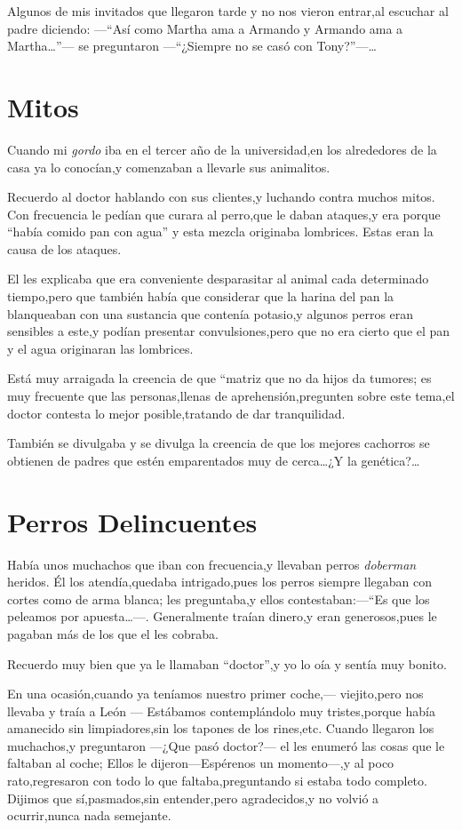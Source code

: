 \documentclass[letterpaper,12pt]{book}
\begin{document}
Algunos de mis invitados que llegaron tarde y no nos vieron entrar,al escuchar al padre diciendo: ---``Así como Martha ama a Armando y Armando ama a Martha\ldots''--- se preguntaron ---``¿Siempre no se casó con Tony?''---\ldots

\chapter{Mitos}
Cuando mi \textit{gordo} iba en el tercer año de la universidad,en los alrededores de la casa ya lo conocían,y comenzaban a llevarle sus animalitos.

Recuerdo al doctor hablando con sus clientes,y luchando contra muchos mitos. Con frecuencia le pedían que curara al perro,que le daban ataques,y era porque ``había comido pan con agua'' y esta mezcla originaba lombrices. Estas eran la causa de los ataques.

El les explicaba que era conveniente desparasitar al animal cada determinado tiempo,pero que también había que considerar que la harina del pan la blanqueaban con una sustancia que contenía potasio,y algunos perros eran sensibles a este,y podían presentar convulsiones,pero que no era cierto que el pan y el agua originaran las lombrices.

Está muy arraigada la creencia de que ``matriz que no da hijos da tumores; es muy frecuente que las personas,llenas de aprehensión,pregunten sobre este tema,el doctor contesta lo mejor posible,tratando de dar tranquilidad. 

También se divulgaba y se divulga la creencia de que los mejores cachorros se obtienen de padres que estén emparentados muy de cerca\ldots¿Y la genética?\ldots

\chapter{Perros Delincuentes}
Había unos muchachos que iban con frecuencia,y llevaban perros \textit{doberman} heridos. Él los atendía,quedaba intrigado,pues los perros siempre llegaban con cortes como de arma blanca; les preguntaba,y ellos contestaban:---``Es que los peleamos por apuesta\ldots---. Generalmente traían dinero,y eran generosos,pues le pagaban más de los que el les cobraba.

Recuerdo muy bien que ya le llamaban ``doctor'',y yo lo oía y sentía muy bonito.

En una ocasión,cuando ya teníamos nuestro primer coche,--- viejito,pero nos llevaba y traía a León --- Estábamos contemplándolo muy tristes,porque había amanecido sin limpiadores,sin los tapones de los rines,etc. Cuando llegaron los muchachos,y preguntaron ---¿Que pasó doctor?--- el les enumeró las cosas que le faltaban al coche; Ellos le dijeron---Espérenos un momento---,y al poco rato,regresaron con todo lo que faltaba,preguntando si estaba todo completo. Dijimos que sí,pasmados,sin entender,pero agradecidos,y no volvió a ocurrir,nunca nada semejante.
\end{document}
